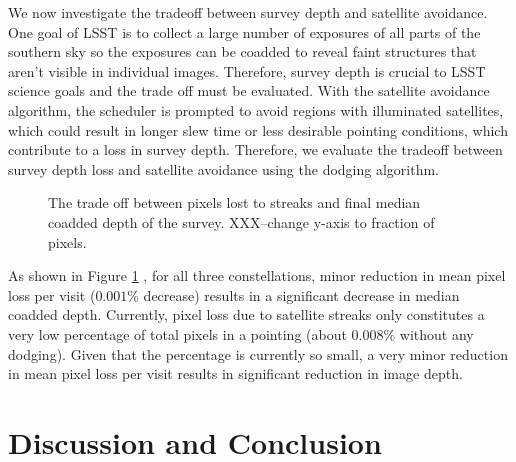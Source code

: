 \documentclass[linenumbers]{aastex631}
\begin{document}
We now investigate the tradeoff between survey depth and satellite avoidance. One goal of LSST is to collect a large number of exposures of all parts of the southern sky so the exposures can be coadded to reveal faint structures that aren’t visible in individual images. Therefore, survey depth is crucial to LSST science goals and the trade off must be evaluated. With the satellite avoidance algorithm, the scheduler is prompted to avoid regions with illuminated satellites, which could result in longer slew time or less desirable pointing conditions, which contribute to a loss in survey depth. Therefore, we evaluate the tradeoff between survey depth loss and satellite avoidance using the dodging algorithm.\\

\begin{figure}[ht!]
\caption{The trade off between pixels lost to streaks and final median coadded depth of the survey. XXX--change y-axis to fraction of pixels. \label{fig-trade-off}}
\end{figure}

As shown in Figure \ref{fig-trade-off} , for all three constellations, minor reduction in mean pixel loss per visit ($0.001\%$ decrease) results in a significant decrease in median coadded depth. Currently, pixel loss due to satellite streaks only constitutes a very low percentage of total pixels in a pointing (about $0.008\%$ without any dodging). Given that the percentage is currently so small, a very minor reduction in mean pixel loss per visit results in significant reduction in image depth.

\section{Discussion and Conclusion}
\end{document}
